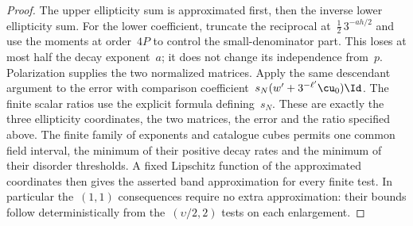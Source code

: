 \documentclass[11pt]{amsart}
\begin{document}
\begin{proof}
\smallskip

The upper ellipticity sum is approximated first, then the inverse lower ellipticity sum. For the lower coefficient, truncate the reciprocal at~$\frac12\,3^{-ah/2}$ and use the moments at order~$4P$ to control the small-denominator part. This loses at most half the decay exponent~$a$; it does not change its independence from~$p$. Polarization supplies the two normalized matrices. Apply the same descendant argument to the error with comparison coefficient~$s_N(w'+3^{-\ell'}\cu_0)\Id$. The finite scalar ratios use the explicit formula defining~$s_N$. These are exactly the three ellipticity coordinates, the two matrices, the error and the ratio specified above. The finite family of exponents and catalogue cubes permits one common field interval, the minimum of their positive decay rates and the minimum of their disorder thresholds. A fixed Lipschitz function of the approximated coordinates then gives the asserted band approximation for every finite test. In particular the~$(1,1)$ consequences require no extra approximation: their bounds follow deterministically from the~$(\upsilon/2,2)$ tests on each enlargement.

\smallskip


\end{proof}
\end{document}
